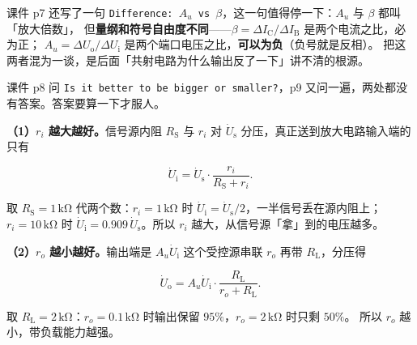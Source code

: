 \documentclass[11pt]{ctexart}
\begin{document}
课件 p7 还写了一句 \texttt{Difference: $A_u$ vs $\beta$}，这一句值得停一下：$A_u$ 与 $\beta$ 都叫「放大倍数」，
但\textbf{量纲和符号自由度不同}——$\beta=\Delta I_{\mathrm{C}}/\Delta I_{\mathrm{B}}$ 是两个电流之比，必为正；
$A_u=\Delta U_{\mathrm{o}}/\Delta U_{\mathrm{i}}$ 是两个端口电压之比，\textbf{可以为负}（负号就是反相）。
把这两者混为一谈，是后面「共射电路为什么输出反了一下」讲不清的根源。


课件 p8 问 \texttt{Is it better to be bigger or smaller?}，p9 又问一遍，两处都没有答案。答案要算一下才服人。

\textbf{（1）$r_i$ 越大越好。}信号源内阻 $R_{\mathrm{S}}$ 与 $r_i$ 对 $\dot{U}_{\mathrm{s}}$ 分压，真正送到放大电路输入端的只有

\[ \dot{U}_{\mathrm{i}}=\dot{U}_{\mathrm{s}}\cdot\frac{r_i}{R_{\mathrm{S}}+r_i} . \]

取 $R_{\mathrm{S}}=1\,\mathrm{k\Omega}$ 代两个数：$r_i=1\,\mathrm{k\Omega}$ 时 $\dot{U}_{\mathrm{i}}=\dot{U}_{\mathrm{s}}/2$，一半信号丢在源内阻上；
$r_i=10\,\mathrm{k\Omega}$ 时 $\dot{U}_{\mathrm{i}}=0.909\,\dot{U}_{\mathrm{s}}$。所以 $r_i$ 越大，从信号源「拿」到的电压越多。

\textbf{（2）$r_o$ 越小越好。}输出端是 $A_u\dot{U}_{\mathrm{i}}$ 这个受控源串联 $r_o$ 再带 $R_{\mathrm{L}}$，分压得

\[ \dot{U}_{\mathrm{o}}=A_u\dot{U}_{\mathrm{i}}\cdot\frac{R_{\mathrm{L}}}{r_o+R_{\mathrm{L}}} . \]

取 $R_{\mathrm{L}}=2\,\mathrm{k\Omega}$：$r_o=0.1\,\mathrm{k\Omega}$ 时输出保留 $95\%$，$r_o=2\,\mathrm{k\Omega}$ 时只剩 $50\%$。
所以 $r_o$ 越小，带负载能力越强。


\end{document}
